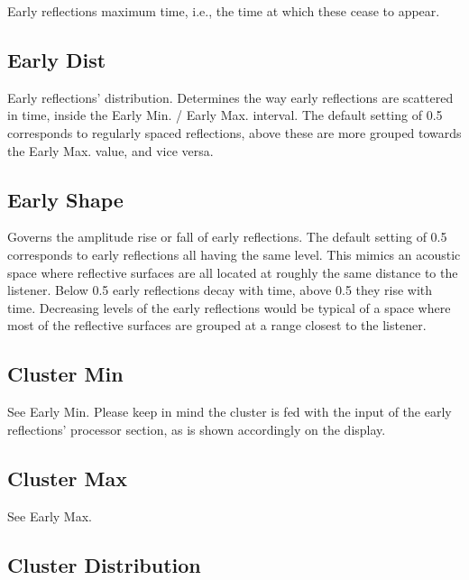 \documentclass[
  letterpaper,
  DIV=11,
  numbers=noendperiod]{scrreport}
\begin{document}
Early reflections maximum time, i.e., the time at which these cease to
appear.

\hypertarget{early-dist}{%
\subsection{Early Dist}\label{early-dist}}

Early reflections' distribution. Determines the way early reflections
are scattered in time, inside the Early Min. / Early Max. interval. The
default setting of 0.5 corresponds to regularly spaced reflections,
above these are more grouped towards the Early Max. value, and vice
versa.

\hypertarget{early-shape}{%
\subsection{Early Shape}\label{early-shape}}

Governs the amplitude rise or fall of early reflections. The default
setting of 0.5 corresponds to early reflections all having the same
level. This mimics an acoustic space where reflective surfaces are all
located at roughly the same distance to the listener. Below 0.5 early
reflections decay with time, above 0.5 they rise with time. Decreasing
levels of the early reflections would be typical of a space where most
of the reflective surfaces are grouped at a range closest to the
listener.

\hypertarget{cluster-min}{%
\subsection{Cluster Min}\label{cluster-min}}

See Early Min. Please keep in mind the cluster is fed with the input of
the early reflections' processor section, as is shown accordingly on the
display.

\hypertarget{cluster-max}{%
\subsection{Cluster Max}\label{cluster-max}}

See Early Max.

\hypertarget{cluster-distribution}{%
\subsection{Cluster Distribution}\label{cluster-distribution}}
\end{document}
